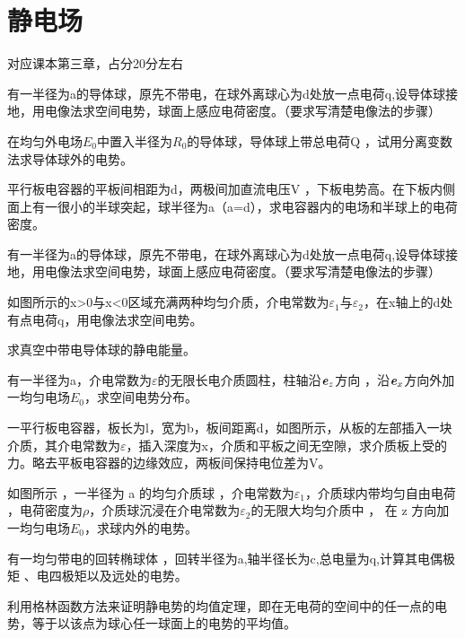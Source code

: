 \section{静电场}
对应课本第三章，占分20分左右

\begin{question}
有一半径为a的导体球，原先不带电，在球外离球心为d处放一点电荷q,设导体球接地，用电像法求空间电势，球面上感应电荷密度。（要求写清楚电像法的步骤）
\end{question}

\begin{question}
在均匀外电场$E_0$中置入半径为$R_0$的导体球，导体球上带总电荷Q ，试用分离变数法求导体球外的电势。
\end{question}

\begin{question}
平行板电容器的平板间相距为d，两极间加直流电压V ，下板电势高。在下板内侧面上有一很小的半球突起，球半径为a（a=d），求电容器内的电场和半球上的电荷密度。
\end{question}

\begin{question}
有一半径为a的导体球，原先不带电，在球外离球心为d处放一点电荷q,设导体球接地，用电像法求空间电势，球面上感应电荷密度。（要求写清楚电像法的步骤）
\end{question}

\begin{question}
如图所示的x>0与x<0区域充满两种均匀介质，介电常数为$\varepsilon_1$与$\varepsilon_2$，在x轴上的d处有点电荷q，用电像法求空间电势。
\end{question}

\begin{question}
求真空中带电导体球的静电能量。
\end{question}

\begin{question}
有一半径为a，介电常数为$\varepsilon$的无限长电介质圆柱，柱轴沿$\textbf{\textit{e}}_z$方向
，沿$\textbf{\textit{e}}_x$方向外加一均匀电场$E_0$，求空间电势分布。
\end{question}

\begin{question}
一平行板电容器，板长为l，宽为b，板间距离d，如图所示，从板的左部插入一块介质，其介电常数为$\varepsilon$，插入深度为x，介质和平板之间无空隙，求介质板上受的力。略去平板电容器的边缘效应，两板间保持电位差为V。
\end{question}

\begin{question}
如图所示 ，一半径为 a 的均匀介质球 ，介电常数为$\varepsilon_1$，介质球内带均匀自由电荷 ，电荷密度为$\rho$，介质球沉浸在介电常数为$\varepsilon_2$的无限大均匀介质中 ， 在 z 方向加一均匀电场$E_0$，求球内外的电势。
\end{question}

\begin{question}
有一均匀带电的回转椭球体 ，回转半径为a,轴半径长为c,总电量为q,计算其电偶极矩 、电四极矩以及远处的电势。
\end{question}

\begin{question}
利用格林函数方法来证明静电势的均值定理，即在无电荷的空间中的任一点的电势，等于以该点为球心任一球面上的电势的平均值。
\end{question}